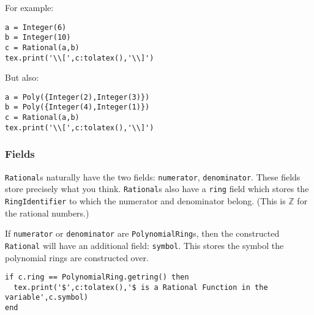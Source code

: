 \documentclass{article}
\begin{document}
For example:
\begin{codebox}
    \begin{verbatim}
a = Integer(6)
b = Integer(10)
c = Rational(a,b)
tex.print('\\[',c:tolatex(),'\\]')
\end{verbatim}
\tcblower
{}
\end{codebox}
But also:
\begin{codebox}
    \begin{verbatim}
a = Poly({Integer(2),Integer(3)})
b = Poly({Integer(4),Integer(1)})
c = Rational(a,b)
tex.print('\\[',c:tolatex(),'\\]')
\end{verbatim}
\tcblower
{}
\end{codebox}

\subsubsection*{Fields}

\texttt{Rational}s naturally have the two fields: \texttt{numerator}, \texttt{denominator}. These fields store precisely what you think. \texttt{Rational}s also have a \texttt{ring} field which stores the \texttt{RingIdentifier} to which the numerator and denominator belong. (This is $\mathbb{Z}$ for the rational numbers.)

If \texttt{numerator} or \texttt{denominator} are \texttt{PolynomialRing}s, then the constructed \texttt{Rational} will have an additional field: \texttt{symbol}. This stores the symbol the polynomial rings are constructed over.

\begin{codebox}[]
    \begin{verbatim}
if c.ring == PolynomialRing.getring() then
  tex.print('$',c:tolatex(),'$ is a Rational Function in the variable',c.symbol)
end
\end{verbatim}
\tcblower
{}
\end{codebox}
\end{document}
